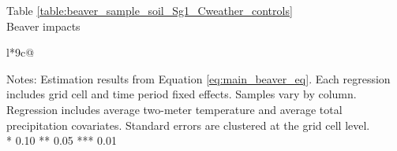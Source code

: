 \begin{table}[htb]
\captionlistentry[table]{}
\label{table:beaver_sample_soil_Sg1_Cweather_controls}
\centering
Table \ref{table:beaver_sample_soil_Sg1_Cweather_controls} \\
Beaver impacts \\
\begin{threeparttable}
\begin{tabulary}{\textwidth}{l*{9}{c}@{}}
\toprule \toprule
\noalign{\smallskip}
\noalign{\smallskip}
\midrule \bottomrule
\end{tabulary}
\medskip
\begin{tablenotes}[flushleft]
\setlength{}
\item
\footnotesize
\justify
Notes: Estimation results from Equation \eqref{eq:main_beaver_eq}.
Each regression includes grid cell and time period fixed effects.
Samples vary by column. Regression includes average two-meter temperature and average total precipitation covariates.
Standard errors are clustered at the grid cell level. \\
\mbox{*} 0.10 ** 0.05 *** 0.01
\end{tablenotes}
\end{threeparttable}
\end{table}

